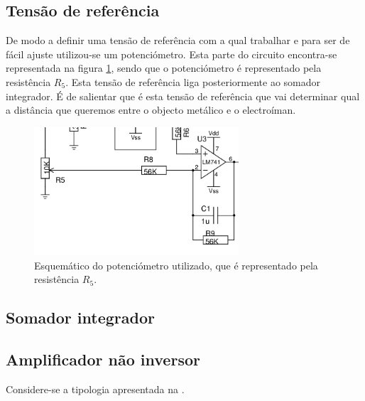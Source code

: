 \documentclass[%
  reprint,
  nofootinbib,
  amsmath,amssymb,
  aps,
  10pt,
  a4paper
]{revtex4-1}
\begin{document}
\subsection{Tensão de referência}
De modo a definir uma tensão de referência com a qual trabalhar e para ser de fácil ajuste utilizou-se um potenciómetro. Esta parte do circuito encontra-se representada na figura \ref{fig:tensaoreferencia}, sendo que o potenciómetro é representado pela resistência $R_5$. Esta tensão de referência liga posteriormente ao somador integrador. É de salientar que é esta tensão de referência que vai determinar qual a distância que queremos entre o objecto metálico e o electroíman.

\begin{figure}[h]
\includegraphics[width=3in]{../img/ref.png}
\caption{Esquemático do potenciómetro utilizado, que é representado pela resistência $R_5$.}
\label{fig:tensaoreferencia}
\end{figure}




\subsection{Somador integrador}







\subsection{Amplificador não inversor}

Considere-se a tipologia apresentada na .


\end{document}
